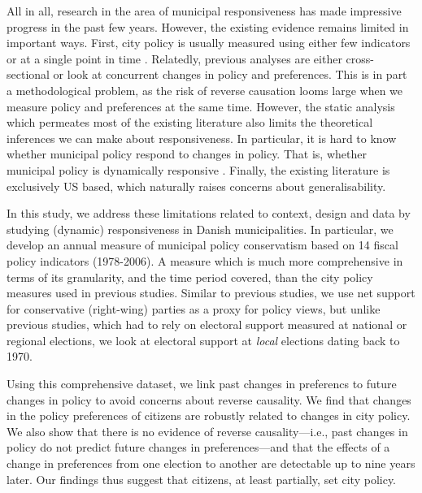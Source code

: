 \documentclass[a4paper,12pt]{article}
\begin{document}
All in all, research in the area of municipal responsiveness has made impressive progress in the past few years. However, the existing evidence remains limited in important ways. First, city policy is usually measured using either few indicators \citep{sances2017voters,einstein2016pushing} or at a single point in time \citep{tausanovitch2014representation}. Relatedly, previous analyses are either cross-sectional or look at concurrent changes in policy and preferences. This is in part a methodological problem, as the risk of reverse causation looms large when we measure policy and preferences at the same time. However, the static analysis which permeates most of the existing literature also limits the theoretical inferences we can make about responsiveness. In particular, it is hard to know whether municipal policy respond to changes in policy. That is, whether municipal policy is dynamically responsive \citep{stimson1995dynamic}. Finally, the existing literature is exclusively US based, which naturally raises concerns about generalisability.


In this study, we address these limitations related to context, design and data by studying (dynamic) responsiveness in Danish municipalities. In particular, we develop an annual measure of municipal policy conservatism based on 14 fiscal policy indicators (1978-2006). A measure which is much more comprehensive in terms of its granularity, and the time period covered, than the city policy measures used in previous studies. Similar to previous studies, we use net support for conservative (right-wing) parties as a proxy for policy views, but unlike previous studies, which had to rely on electoral support measured at national or regional elections, we look at electoral support at \textit{local} elections dating back to 1970. 

Using this comprehensive dataset, we link past changes in preferencs to future changes in policy to avoid concerns about reverse causality. We find that changes in the policy preferences of citizens are robustly related to changes in city policy. We also show that there is no evidence of reverse causality---i.e., past changes in policy do not predict future changes in preferences---and that the effects of a change in preferences from one election to another are detectable up to nine years later. Our findings thus suggest that citizens, at least partially, set city policy.
\end{document}
